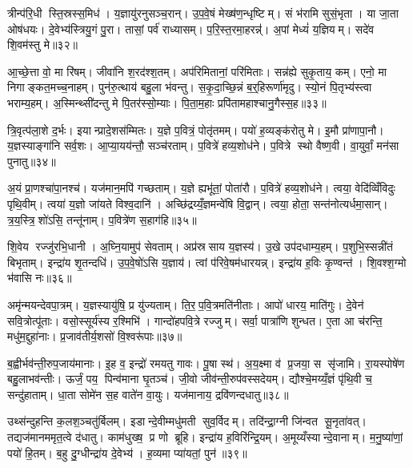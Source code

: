 त्रीन्प॑रि॒धी स्ति॒स्रस्स॒मिध॑। य॒ज्ञायु॑रनुसञ्च॒रान्। उ॒प॒वे॒षं मेख्ष॑ण॒न्धृष्टिम्। सं भ॑रामि सुसं॒भृता। या जा॒ता ओष॑धयः। दे॒वेभ्य॑स्त्रियु॒गं पु॒रा। तासां॒ पर्व॑ राध्यासम्। प॒रि॒स्त॒रमा॒हरन्न्॑॑। अ॒पां मेध्यं॑ य॒ज्ञियम्। सदे॑व शि॒वम॑स्तु मे॥३२॥

आ॒च्छे॒त्ता वो॒ मा रि॑षम्। जीवा॑नि श॒रद॑श्श॒तम्। अप॑रिमितानां॒ परि॑मिताः। सन्न॑ह्ये सुकृ॒ताय॒ कम्। एनो॒ मा निगाङ्कत॒मच्च॒नाहम्। पुन॑रु॒त्थाय॑ बहु॒ला भ॑वन्तु। स॒कृ॒दा॒च्छि॒न्नं ब॒र्॒हिरूर्णा॑मृदु। स्यो॒नं पि॒तृभ्य॑स्त्वा भराम्य॒हम्। अ॒स्मिन्थ्सी॑दन्तु मे पि॒तर॑स्सो॒म्याः। पि॒ता॒म॒हाः प्रपि॑तामहाश्चानु॒गैस्स॒ह॥३३॥

त्रि॒वृत्प॑ला॒शे द॒र्भः। इयान्प्रादे॒शस॑म्मितः। य॒ज्ञे प॒वित्रं॒ पोतृ॑तमम्। पयो॑ ह॒व्यङ्क॑रोतु मे। इ॒मौ प्रा॑णापा॒नौ। य॒ज्ञस्याङ्गा॑नि सर्व॒शः। आ॒प्या॒यय॑न्तौ॒ सञ्च॑रताम्। प॒वित्रे॑ हव्य॒शोध॑ने। प॒वित्रे स्थो वैष्ण॒वी। वा॒युर्वां॒ मन॑सा पुनातु॥३४॥

अ॒यं प्रा॒णश्चा॑पा॒नश्च॑। यज॑मान॒मपि॑ गच्छताम्। य॒ज्ञे ह्यभू॑तां॒ पोता॑रौ। प॒वित्रे॑ हव्य॒शोध॑ने। त्वया॒ वेदि॑व्विँविदुः पृथि॒वीम्। त्वया॑ य॒ज्ञो जा॑यते विश्व॒दानि॑। अच्छि॑द्रय्यँ॒ज्ञमन्वे॑षि वि॒द्वान्। त्वया॒ होता॒ सन्त॑नोत्यर्धमा॒सान्। त्र॒य॒स्त्रि॒शो॑ऽसि॒ तन्तू॑नाम्। प॒वित्रे॑ण स॒हाग॑हि॥३५॥

शि॒वेय रज्जु॑रभि॒धानी। अ॒घ्नि॒यामुप॑ सेवताम्। अप्र॑स्रसाय य॒ज्ञस्य॑। उ॒खे उप॑दधाम्य॒हम्। प॒शुभि॒स्सन्नी॑तं बिभृताम्। इन्द्रा॑य शृ॒तन्दधि॑। उ॒प॒वे॒षो॑ऽसि य॒ज्ञाय॑। त्वां प॑रिवे॒षम॑धारयन्न्। इन्द्रा॑य ह॒विः कृ॒ण्वन्त॑। शि॒वश्श॒ग्मो भ॑वासि नः॥३६॥

अमृ॑न्मयन्देवपा॒त्रम्। य॒ज्ञस्यायु॑षि॒ प्र यु॑ज्यताम्। ति॒र॒प॒वि॒त्रमति॑नीताः। आपो॑ धारय॒ माति॑गुः। दे॒वेन॑ सवि॒त्रोत्पू॑ताः। वसो॒स्सूर्य॑स्य र॒श्मिभि॑। गान्दो॑हपवि॒त्रे रज्जुम्। सर्वा॒ पात्रा॑णि शुन्धत। ए॒ता आ च॑रन्ति॒ मधु॑म॒द्दुहा॑नाः। प्र॒जाव॑तीर्य॒शसो॑ वि॒श्वरू॑पाः॥३७॥

ब॒ह्वीर्भव॑न्ती॒रुप॒जाय॑मानाः। इ॒ह व॒ इन्द्रो॑ रमयतु गावः। पू॒षा स्थ॑। अ॒य॒क्ष्मा व॑ प्र॒जया॒ स सृ॑जामि। रा॒यस्पोषे॑ण बहु॒लाभव॑न्तीः। ऊर्जं॒ पय॒ पिन्व॑माना घृ॒तञ्च॑। जी॒वो जीव॑न्ती॒रुप॑वस्सदेयम्। द्यौश्चे॒मय्यँ॒ज्ञं पृ॑थि॒वी च॒ सन्दु॑हाताम्। धा॒ता सोमे॑न स॒ह वाते॑न वा॒युः। यज॑मानाय॒ द्रवि॑णन्दधातु॥३८॥

उथ्स॑न्दुहन्ति क॒लश॒ञ्चतु॑र्बिलम्। इडान्दे॒वीम्मधु॑मती सुव॒र्विदम्। तदि॑न्द्रा॒ग्नी जि॑न्वत सू॒नृता॑वत्। तद्यज॑मानममृत॒त्वे द॑धातु। काम॑धुख्ष॒ प्र णो ब्रूहि। इन्द्रा॑य ह॒विरि॑न्द्रि॒यम्। अ॒मूय्यँस्यान्दे॒वानाम्। म॒नु॒ष्या॑णां॒ पयो॑ हि॒तम्। ब॒हु दु॒ग्धीन्द्रा॑य दे॒वेभ्य॑। ह॒व्यमा प्या॑यतां॒ पुन॑॥३९॥

